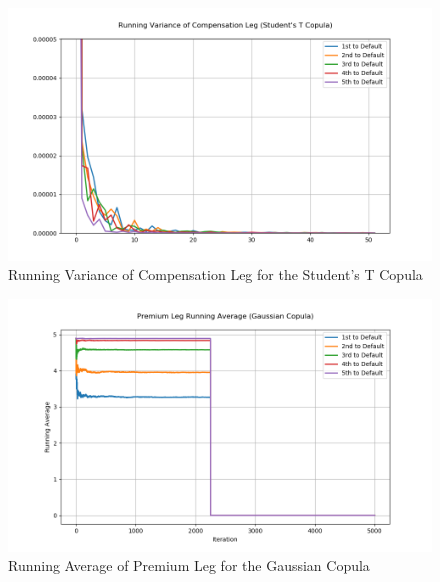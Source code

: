 \documentclass{report}
\theoremstyle{plain}
\theoremstyle{definition}
\begin{document}
\begin{figure}[H]
	\begin{center}
		\includegraphics[width=15cm]{Running_Variance_of_Compensation_Leg_(Student's_T_Copula).png}
		\caption{Running Variance of Compensation Leg for the Student's T Copula} 
		\label{Running_Variance_of_Compensation_Leg_(Student's_T_Copula)}
	\end{center}
\end{figure}

\begin{figure}[H]
	\begin{center}
		\includegraphics[width=15cm]{Premium_Leg_Running_Average_(Gaussian_Copula).png}
		\caption{Running Average of Premium Leg for the Gaussian Copula} 
		\label{Premium_Leg_Running_Average_(Gaussian_Copula)}
	\end{center}
\end{figure}
\end{document}
